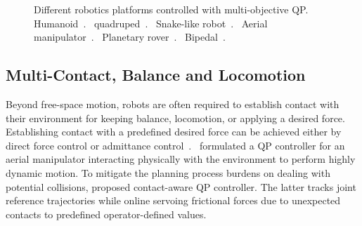 \begin{figure}
	\centering
	\hfil
\caption{Different robotics platforms controlled with multi-objective QP.~ Humanoid~\cite{djeha2020ral}.~ quadruped~\cite{xin2020frontiers}.~ Snake-like robot~\cite{basso2020ifac}.~ Aerial manipulator~\cite{nava2020ral}.~ Planetary rover~\cite{bussmann2018icra}.~ Bipedal~\cite{reher2020acc}.}
\label{fig:QP controlled robots}
\end{figure}

\subsection{Multi-Contact, Balance and Locomotion}
Beyond free-space motion, robots are often required to establish contact with their environment for keeping balance, locomotion, or applying a desired force. 
Establishing contact with a predefined desired force can be achieved either by direct force control or admittance control~\cite{pham2020ral}.~\cite{nava2020ral} formulated a QP controller for an aerial manipulator interacting physically with the environment to perform highly dynamic motion. To mitigate the planning process burdens on dealing with potential collisions, \cite{pang2021arxiv} proposed contact-aware QP controller. The latter tracks joint reference trajectories while online servoing  frictional forces due to unexpected contacts to predefined operator-defined values. 

